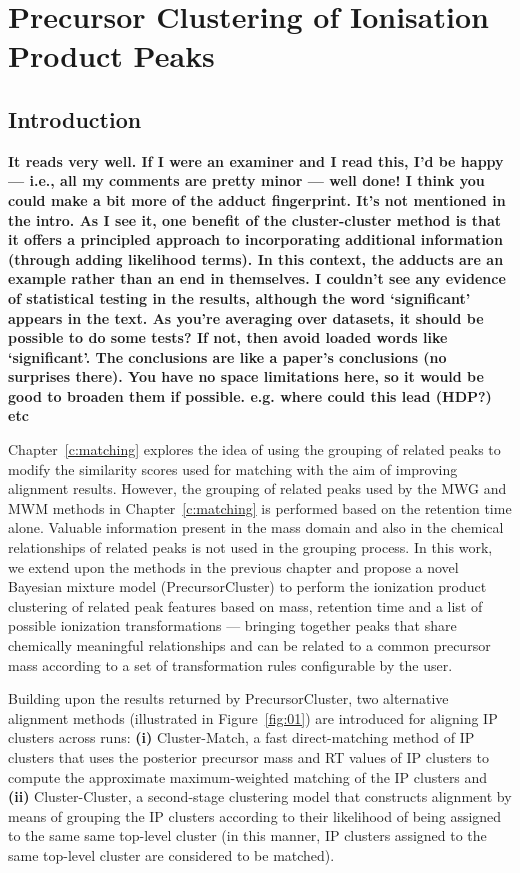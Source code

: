 \chapter{Precursor Clustering of Ionisation Product Peaks}
\label{c:precursor-clustering}

\section{Introduction}

\textbf{It reads very well. If I were an examiner and I read this, I’d be happy — i.e., all my comments are pretty minor — well done!
I think you could make a bit more of the adduct fingerprint. It’s not mentioned in the intro. As I see it, one benefit of the cluster-cluster method is that it offers a principled approach to incorporating additional information (through adding likelihood terms). In this context, the adducts are an example rather than an end in themselves.
I couldn’t see any evidence of statistical testing in the results, although the word ‘significant’ appears in the text. As you’re averaging over datasets, it should be possible to do some tests? If not, then avoid loaded words like ‘significant’.
The conclusions are like a paper’s conclusions (no surprises there). You have no space limitations here, so it would be good to broaden them if possible. e.g. where could this lead (HDP?) etc}

Chapter~\ref{c:matching} explores the idea of using the grouping of related peaks to modify the similarity scores used for matching with the aim of improving alignment results. However, the grouping of related peaks used by the MWG and MWM methods in Chapter~\ref{c:matching} is performed based on the retention time alone. Valuable information present in the mass domain and also in the chemical relationships of related peaks is not used in the grouping process. In this work, we extend upon the methods in the previous chapter and propose a novel Bayesian mixture model (PrecursorCluster) to perform the ionization product clustering of related peak features based on mass, retention time and a list of possible ionization transformations --- bringing together peaks that share chemically meaningful relationships and can be related to a common precursor mass according to a set of transformation rules configurable by the user. 

Building upon the results returned by PrecursorCluster, two alternative alignment methods (illustrated in Figure~\ref{fig:01}) are introduced for aligning IP clusters across runs: \textbf{(i)} Cluster-Match, a fast direct-matching method of IP clusters that uses the posterior precursor mass and RT values of IP clusters to compute the approximate maximum-weighted matching of the IP clusters and \textbf{(ii)} Cluster-Cluster, a second-stage clustering model that constructs alignment by means of grouping the IP clusters according to their likelihood of being assigned to the same same top-level cluster (in this manner, IP clusters assigned to the same top-level cluster are considered to be matched). 

